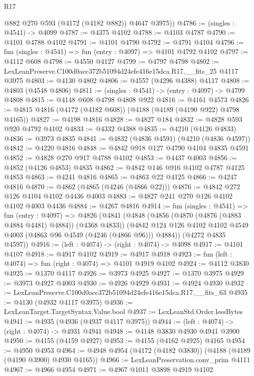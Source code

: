 \begin{lexlean}{R17}
\begin{coremodule}
        @882
        @270
        @593
        (@4172 (@4182 @882))
        @4647
        @3975))
@4786 := (singles : @4541) -> @4099
@4787 := @4375 @4102
@4788 := @4103 @4787
@4790 := @4101 @4788 @4102
@4791 := @4101 @4790
@4792 := @4791 @4104
@4796 := fun (singles : @4541) => fun (entry : @4097) => @4101 @4792 @4102
@4797 := @4112 @608
@4798 := @4550 @4127
@4799 := @4797 @4798
@4802 := LexLeanPreserve.C100d0aec372b51094d24efe416e15dca.R17.__fits_25 @4117 @3975
@4803 := @4130 @4802
@4806 := @4557 (@4296 @4388) @4117
@4808 := @4803 (@4548 @4806)
@4811 := (singles : @4541) -> (entry : @4097) -> @4799 @4808
@4815 := @4148 @608 @4798 @4808 @922
@4816 := @4161 @4573
@4826 := @4815 @4816 (@4172 (@4182 @608)) (@4188 (@4189 (@4190 @922) @4798 @4165))
@4827 := @4198 @4816
@4828 := @4827 @184
@4832 := @4828 @593 @920 @4792 @4102
@4833 := @4332 @4388
@4835 := @4210 (@4126 @4833)
@4836 := @3973 @4835
@4841 := @4832 (@4836 @4591) (@4210 (@4836 @4597))
@4842 := @4220 @4816
@4848 := @4842 @918 @127 @4790 @4104 @4835 @4591
@4852 := @4828 @270 @917 @4788 @4102
@4853 := @4437 @4003
@4856 := @4852 (@4126 @4853) @4835
@4862 := @4842 @146 @916 @4102 @4787 @4125 @4853
@4863 := @4241 @4816
@4865 := @4863 @22 @4125
@4866 := @4247 @4816
@4870 := @4862 (@4865 (@4246 (@4866 @22)))
@4876 := @4842 @272 @126 @4104 @4102 @4436 @4003
@4883 := @4827 @241 @270 @126 @4102 @4102 @4003 @4436
@4884 := @4267 @4816
@4914 := fun (singles : @4541) =>
  fun (entry : @4097) =>
  @4826
    (@4841
      (@4848
        (@4856 (@4870 (@4876 (@4883 @4884 @4481) @4884)) (@4368 @4833))
        (@4842 @124 @126 @4102 @4102 @4549 @4003 (@4863 @96 @4549 (@4246 (@4866 @96))) @4884))
      (@4272 @4835 @4597))
@4916 := (left : @4074) -> (right : @4074) -> @4098
@4917 := @4101 @4107
@4918 := @4917 @4102
@4919 := @4917 @4918
@4923 := fun (left : @4074) => fun (right : @4074) => @4101 @4919 @4102
@4924 := @4112 @3830
@4925 := @1370 @4117
@4926 := @3973 @4925
@4927 := @1370 @3975
@4929 := @3973 @4927 @4003
@4930 := @4926 @4929
@4931 := @4924 @4930
@4932 := LexLeanPreserve.C100d0aec372b51094d24efe416e15dca.R17.__fits_63
@4935 := @4130 (@4932 @4117 @3975)
@4936 := LexLeanTarget.TargetSyntax.Value.bool
@4937 := LexLeanStd.Order.lessBytes
@4941 := @4935 (@4936 (@4937 @4117 @3975))
@4944 := (left : @4074) -> (right : @4074) -> @4931 @4941
@4948 := @4148 @3830 @4930 @4941 @3900
@4950 := @4155 (@4159 @4927)
@4953 := @4155 (@4162 @4925) @4165
@4954 := @4950 @4953
@4964 := @4948 @4954 (@4172 (@4182 @3830)) (@4188 (@4189 (@4190 @3900) @4930 @4165))
@4966 := LexLeanPreservation.conv_prim @4111
@4967 := @4966 @4954
@4971 := @4967 @1011 @3898 @4919 @4102

\end{coremodule}
\end{lexlean}
